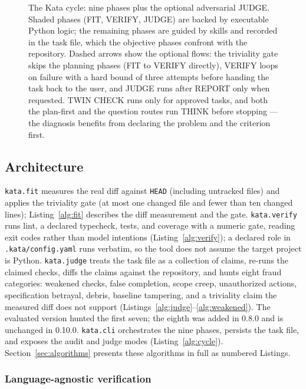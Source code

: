 \documentclass{sbc2019}%
\begin{document}
\begin{figure}[!ht]
\caption{The Kata cycle: nine phases plus the optional adversarial JUDGE.
Shaded phases (FIT, VERIFY, JUDGE) are backed by executable Python logic;
the remaining phases are guided by skills and recorded in the task file,
which the objective phases confront with the repository. Dashed arrows show
the optional flows: the triviality gate skips the planning phases (FIT to
VERIFY directly), VERIFY loops on failure with a hard bound of three
attempts before handing the task back to the user, and JUDGE runs after
REPORT only when requested. TWIN CHECK runs only for approved tasks, and
both the plan-first and the question routes run THINK before stopping ---
the diagnosis benefits from declaring the problem and the criterion first.}
\label{fig:cycle}
\end{figure}

\subsection{Architecture}

\texttt{kata.fit} measures the real diff against \texttt{HEAD} (including
untracked files) and applies the triviality gate (at most one changed file
and fewer than ten changed lines); Listing~\ref{alg:fit} describes the
diff measurement and the gate. \texttt{kata.verify} runs lint, a declared
typecheck, tests, and coverage with a numeric gate, reading exit codes rather
than model intentions (Listing~\ref{alg:verify}); a declared role in
\texttt{.kata/config.yaml} runs verbatim, so
the tool does not assume the target project is Python.
\texttt{kata.judge}
treats the task file as a collection of claims, re-runs the claimed checks,
diffs the claims against the repository, and hunts eight fraud categories:
weakened checks, false completion, scope creep, unauthorized actions,
specification betrayal, debris, baseline tampering, and a triviality claim
the measured diff does not support
(Listings~\ref{alg:judge}--\ref{alg:weakened}). The evaluated version hunted
the first seven; the eighth was added in 0.8.0 and is unchanged in 0.10.0. \texttt{kata.cli}
orchestrates the nine phases, persists the task file, and exposes the audit
and judge modes (Listing~\ref{alg:cycle}). Section~\ref{sec:algorithms}
presents these algorithms in full as numbered Listings.

\subsubsection{Language-agnostic verification}
\end{document}
